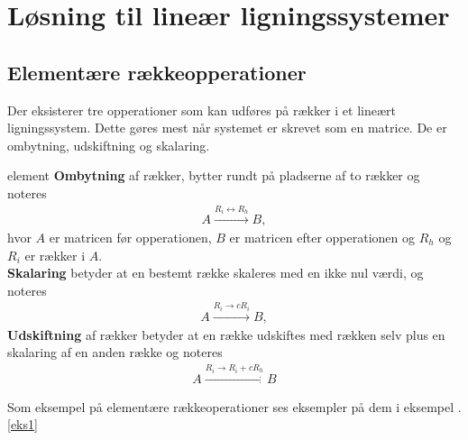 \section{Løsning til lineær ligningssystemer}


\subsection{Elementære rækkeopperationer}
Der eksisterer tre opperationer som kan udføres på rækker i et lineært ligningssystem.
Dette gøres mest når systemet er skrevet som en matrice.
De er ombytning, udskiftning og skalaring.

\begin{defn}{}{element}
\textbf{Ombytning} af rækker, bytter rundt på pladserne af to rækker og noteres
\begin{align*}
A \xrightarrow{R_i \leftrightarrow R_h} B, 
\end{align*}
hvor $A$ er matricen før opperationen, $B$ er matricen efter opperationen og $R_h$ og $R_i$ er rækker i $A$.\\
\textbf{Skalaring} betyder at en bestemt række skaleres med en ikke nul værdi, og noteres
\begin{align*}
A \xrightarrow{R_i \rightarrow cR_i} B, 
\end{align*}
\textbf{Udskiftning} af rækker betyder at en række udskiftes med rækken selv plus en skalaring af en anden række og noteres
\begin{align*}
A \xrightarrow{R_i \rightarrow R_i + cR_h} B
\end{align*}

\end{defn}

Som eksempel på elementære rækkeoperationer ses eksempler på dem i eksempel \thechapter .\ref{eks1}

